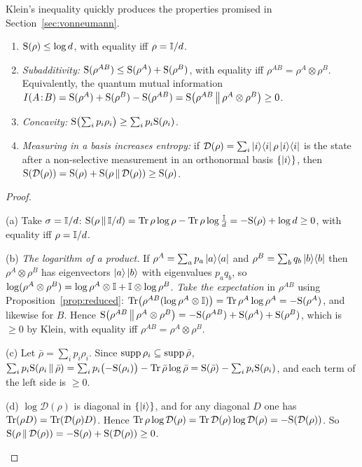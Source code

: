 Klein's inequality quickly produces the properties promised in Section~\ref{sec:vonneumann}.

\begin{corollary}\label{cor:vn-consequences}
  \begin{enumerate}
    \item[(a)] $\mathrm{S}(\rho)\le\log d$, with equality iff $\rho=\mathbb{I}/d$.
    \item[(b)] \emph{Subadditivity:} $\mathrm{S}(\rho^{AB})\le\mathrm{S}(\rho^A)+\mathrm{S}(\rho^B)$, with equality iff $\rho^{AB}=\rho^A\otimes\rho^B$. Equivalently, the quantum mutual information $I(A\!:\!B)=\mathrm{S}(\rho^A)+\mathrm{S}(\rho^B)-\mathrm{S}(\rho^{AB})=\mathrm{S}\!\left(\rho^{AB}\,\middle\|\,\rho^A\otimes\rho^B\right)\ge0$.
    \item[(c)] \emph{Concavity:} $\mathrm{S}\bigl(\sum_ip_i\rho_i\bigr)\ge\sum_ip_i\mathrm{S}(\rho_i)$.
    \item[(d)] \emph{Measuring in a basis increases entropy:} if $\mathcal D(\rho)=\sum_i\left|i\right\rangle\!\left\langle i\right|\rho\left|i\right\rangle\!\left\langle i\right|$ is the state after a non-selective measurement in an orthonormal basis $\{\left|i\right\rangle\}$, then $\mathrm{S}(\mathcal D(\rho))=\mathrm{S}(\rho)+\mathrm{S}\!\left(\rho\,\middle\|\,\mathcal D(\rho)\right)\ge\mathrm{S}(\rho)$.
  \end{enumerate}
\end{corollary}
\begin{proof}
  \begin{steps}
    \item (a) Take $\sigma=\mathbb{I}/d$: $\mathrm{S}\!\left(\rho\,\middle\|\,\mathbb{I}/d\right)=\operatorname{Tr}\rho\log\rho-\operatorname{Tr}\rho\log\frac{\mathbb{I}}d=-\mathrm{S}(\rho)+\log d\ge0$, with equality iff $\rho=\mathbb{I}/d$.
    \item (b) \emph{The logarithm of a product.} If $\rho^A=\sum_ap_a\left|a\right\rangle\!\left\langle a\right|$ and $\rho^B=\sum_bq_b\left|b\right\rangle\!\left\langle b\right|$ then $\rho^A\otimes\rho^B$ has eigenvectors $\left|a\right\rangle\left|b\right\rangle$ with eigenvalues $p_aq_b$, so $\log(\rho^A\otimes\rho^B)=\log\rho^A\otimes\mathbb{I}+\mathbb{I}\otimes\log\rho^B$. \emph{Take the expectation} in $\rho^{AB}$ using Proposition~\ref{prop:reduced}: $\operatorname{Tr}\bigl(\rho^{AB}(\log\rho^A\otimes\mathbb{I})\bigr)=\operatorname{Tr}\rho^A\log\rho^A=-\mathrm{S}(\rho^A)$, and likewise for $B$. Hence $\mathrm{S}\!\left(\rho^{AB}\,\middle\|\,\rho^A\otimes\rho^B\right)=-\mathrm{S}(\rho^{AB})+\mathrm{S}(\rho^A)+\mathrm{S}(\rho^B)$, which is $\ge0$ by Klein, with equality iff $\rho^{AB}=\rho^A\otimes\rho^B$.
    \item (c) Let $\bar\rho=\sum_ip_i\rho_i$. Since $\operatorname{supp}\rho_i\subseteq\operatorname{supp}\bar\rho$, $\sum_ip_i\mathrm{S}\!\left(\rho_i\,\middle\|\,\bar\rho\right)=\sum_ip_i\bigl(-\mathrm{S}(\rho_i)\bigr)-\operatorname{Tr}\bar\rho\log\bar\rho=\mathrm{S}(\bar\rho)-\sum_ip_i\mathrm{S}(\rho_i)$, and each term of the left side is $\ge0$.
    \item (d) $\log\mathcal D(\rho)$ is diagonal in $\{\left|i\right\rangle\}$, and for any diagonal $D$ one has $\operatorname{Tr}(\rho D)=\operatorname{Tr}(\mathcal D(\rho)D)$. Hence $\operatorname{Tr}\rho\log\mathcal D(\rho)=\operatorname{Tr}\mathcal D(\rho)\log\mathcal D(\rho)=-\mathrm{S}(\mathcal D(\rho))$. So $\mathrm{S}\!\left(\rho\,\middle\|\,\mathcal D(\rho)\right)=-\mathrm{S}(\rho)+\mathrm{S}(\mathcal D(\rho))\ge0$. \qedhere
  \end{steps}
\end{proof}

